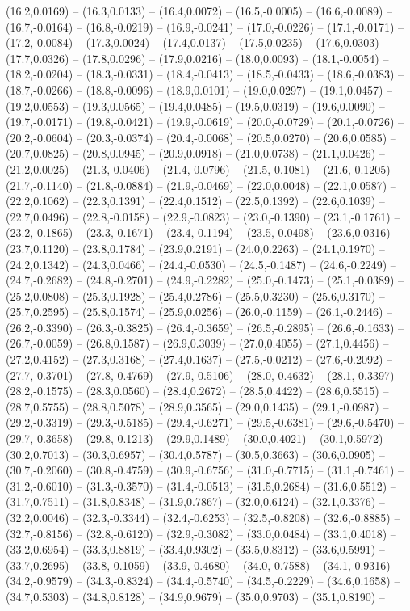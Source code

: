 \documentclass{SVnote}
\begin{document}
(16.2,0.0169) -- (16.3,0.0133) -- (16.4,0.0072) -- (16.5,-0.0005) -- (16.6,-0.0089) -- (16.7,-0.0164) -- (16.8,-0.0219) -- (16.9,-0.0241) -- (17.0,-0.0226) -- (17.1,-0.0171) -- (17.2,-0.0084) -- (17.3,0.0024) -- (17.4,0.0137) -- (17.5,0.0235) -- (17.6,0.0303) -- (17.7,0.0326) -- (17.8,0.0296) -- (17.9,0.0216) -- (18.0,0.0093) -- (18.1,-0.0054) -- (18.2,-0.0204) -- (18.3,-0.0331) -- (18.4,-0.0413) -- (18.5,-0.0433) -- (18.6,-0.0383) -- (18.7,-0.0266) -- (18.8,-0.0096) -- (18.9,0.0101) -- (19.0,0.0297) -- (19.1,0.0457) -- (19.2,0.0553) -- (19.3,0.0565) -- (19.4,0.0485) -- (19.5,0.0319) -- (19.6,0.0090) -- (19.7,-0.0171) -- (19.8,-0.0421) -- (19.9,-0.0619) -- (20.0,-0.0729) -- (20.1,-0.0726) -- (20.2,-0.0604) -- (20.3,-0.0374) -- (20.4,-0.0068) -- (20.5,0.0270) -- (20.6,0.0585) -- (20.7,0.0825) -- (20.8,0.0945) -- (20.9,0.0918) -- (21.0,0.0738) -- (21.1,0.0426) -- (21.2,0.0025) -- (21.3,-0.0406) -- (21.4,-0.0796) -- (21.5,-0.1081) -- (21.6,-0.1205) -- (21.7,-0.1140) -- (21.8,-0.0884) -- (21.9,-0.0469) -- (22.0,0.0048) -- (22.1,0.0587) -- (22.2,0.1062) -- (22.3,0.1391) -- (22.4,0.1512) -- (22.5,0.1392) -- (22.6,0.1039) -- (22.7,0.0496) -- (22.8,-0.0158) -- (22.9,-0.0823) -- (23.0,-0.1390) -- (23.1,-0.1761) -- (23.2,-0.1865) -- (23.3,-0.1671) -- (23.4,-0.1194) -- (23.5,-0.0498) -- (23.6,0.0316) -- (23.7,0.1120) -- (23.8,0.1784) -- (23.9,0.2191) -- (24.0,0.2263) -- (24.1,0.1970) -- (24.2,0.1342) -- (24.3,0.0466) -- (24.4,-0.0530) -- (24.5,-0.1487) -- (24.6,-0.2249) -- (24.7,-0.2682) -- (24.8,-0.2701) -- (24.9,-0.2282) -- (25.0,-0.1473) -- (25.1,-0.0389) -- (25.2,0.0808) -- (25.3,0.1928) -- (25.4,0.2786) -- (25.5,0.3230) -- (25.6,0.3170) -- (25.7,0.2595) -- (25.8,0.1574) -- (25.9,0.0256) -- (26.0,-0.1159) -- (26.1,-0.2446) -- (26.2,-0.3390) -- (26.3,-0.3825) -- (26.4,-0.3659) -- (26.5,-0.2895) -- (26.6,-0.1633) -- (26.7,-0.0059) -- (26.8,0.1587) -- (26.9,0.3039) -- (27.0,0.4055) -- (27.1,0.4456) -- (27.2,0.4152) -- (27.3,0.3168) -- (27.4,0.1637) -- (27.5,-0.0212) -- (27.6,-0.2092) -- (27.7,-0.3701) -- (27.8,-0.4769) -- (27.9,-0.5106) -- (28.0,-0.4632) -- (28.1,-0.3397) -- (28.2,-0.1575) -- (28.3,0.0560) -- (28.4,0.2672) -- (28.5,0.4422) -- (28.6,0.5515) -- (28.7,0.5755) -- (28.8,0.5078) -- (28.9,0.3565) -- (29.0,0.1435) -- (29.1,-0.0987) -- (29.2,-0.3319) -- (29.3,-0.5185) -- (29.4,-0.6271) -- (29.5,-0.6381) -- (29.6,-0.5470) -- (29.7,-0.3658) -- (29.8,-0.1213) -- (29.9,0.1489) -- (30.0,0.4021) -- (30.1,0.5972) -- (30.2,0.7013) -- (30.3,0.6957) -- (30.4,0.5787) -- (30.5,0.3663) -- (30.6,0.0905) -- (30.7,-0.2060) -- (30.8,-0.4759) -- (30.9,-0.6756) -- (31.0,-0.7715) -- (31.1,-0.7461) -- (31.2,-0.6010) -- (31.3,-0.3570) -- (31.4,-0.0513) -- (31.5,0.2684) -- (31.6,0.5512) -- (31.7,0.7511) -- (31.8,0.8348) -- (31.9,0.7867) -- (32.0,0.6124) -- (32.1,0.3376) -- (32.2,0.0046) -- (32.3,-0.3344) -- (32.4,-0.6253) -- (32.5,-0.8208) -- (32.6,-0.8885) -- (32.7,-0.8156) -- (32.8,-0.6120) -- (32.9,-0.3082) -- (33.0,0.0484) -- (33.1,0.4018) -- (33.2,0.6954) -- (33.3,0.8819) -- (33.4,0.9302) -- (33.5,0.8312) -- (33.6,0.5991) -- (33.7,0.2695) -- (33.8,-0.1059) -- (33.9,-0.4680) -- (34.0,-0.7588) -- (34.1,-0.9316) -- (34.2,-0.9579) -- (34.3,-0.8324) -- (34.4,-0.5740) -- (34.5,-0.2229) -- (34.6,0.1658) -- (34.7,0.5303) -- (34.8,0.8128) -- (34.9,0.9679) -- (35.0,0.9703) -- (35.1,0.8190) -- 
\end{document}
